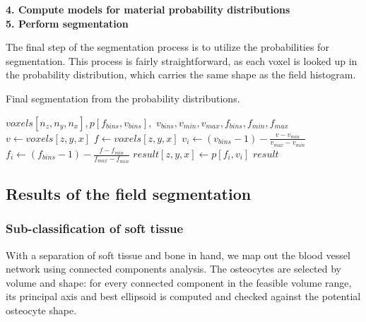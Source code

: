 \vspace{\baselineskip}
\noindent\textbf{4. Compute models for material probability distributions} \\


\vspace{\baselineskip}
\noindent\textbf{5. Perform segmentation}

The final step of the segmentation process is to utilize the probabilities for segmentation.
This process is fairly straightforward, as each voxel is looked up in the probability distribution, which carries the same shape as the field histogram.

\begin{algorithm}
    \caption{Final segmentation from the probability distributions.}
    \label{alg:segment}
    \begin{algorithmic}
         {$voxels[n_z,n_y,n_x], p[f_{bins},v_{bins}],$ \newline $v_{bins}, v_{min}, v_{max}, f_{bins}, f_{min}, f_{max}$}
                \State $v \gets voxels[z,y,x]$
                    \State $f \gets voxels[z,y,x]$
                        \State $v_i \gets (v_{bins} - 1) - \frac{v - v_{min}}{v_{max} - v_{min}}$
                        \State $f_i \gets (f_{bins} - 1) - \frac{f - f_{min}}{f_{max} - f_{min}}$
                        \State $result[z,y,x] \gets p[f_i, v_i]$
                    \EndIf
                \EndIf
            \EndFor
            \Return $result$
        \EndFunction
    \end{algorithmic}
\end{algorithm}

\subsection{Results of the field segmentation}

\subsubsection{Sub-classification of soft tissue}

With a separation of soft tissue and bone in hand, we 
map out the blood vessel network using connected components analysis. 
The osteocytes are selected by volume and shape: for every connected
component in the feasible volume range, its principal axis and best
ellipsoid is computed and checked against the potential osteocyte shape.

